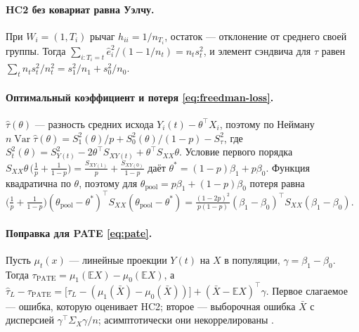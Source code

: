 \documentclass[10pt,a4paper]{article}
\newcommand{\E}{\mathbb{E}}
\newcommand{\Var}{\operatorname{Var}}
\newcommand{\T}{^{\top}}
\begin{document}
\paragraph{HC2 без ковариат равна Уэлчу.} При $W_i=(1,T_i)$ рычаг $h_{ii}=1/n_{T_i}$, остаток --- отклонение от среднего
своей группы. Тогда $\sum_{i:T_i=t}\hat e_i^2/(1-1/n_t)=n_ts_t^2$, и элемент сэндвича для $\tau$ равен
$\sum_t n_ts_t^2/n_t^2=s_1^2/n_1+s_0^2/n_0$.

\paragraph{Оптимальный коэффициент и потеря \eqref{eq:freedman-loss}.} $\hat\tau(\theta)$ --- разность средних исхода
$Y_i(t)-\theta\T X_i$, поэтому по Нейману \citep{neyman1923, imbensrubin2015}
$n\Var\hat\tau(\theta)=S^2_1(\theta)/p+S^2_0(\theta)/(1-p)-S^2_\tau$, где
$S^2_t(\theta)=S^2_{Y(t)}-2\theta\T S_{XY(t)}+\theta\T S_{XX}\theta$. Условие первого порядка
$S_{XX}\theta\,\bigl(\tfrac1p+\tfrac1{1-p}\bigr)=\tfrac{S_{XY(1)}}{p}+\tfrac{S_{XY(0)}}{1-p}$ даёт
$\theta^*=(1-p)\beta_1+p\beta_0$. Функция квадратична по $\theta$, поэтому для $\theta_{\text{pool}}=p\beta_1+(1-p)\beta_0$
потеря равна $\bigl(\tfrac1p+\tfrac1{1-p}\bigr)(\theta_{\text{pool}}-\theta^*)\T S_{XX}(\theta_{\text{pool}}-\theta^*)
=\tfrac{(1-2p)^2}{p(1-p)}(\beta_1-\beta_0)\T S_{XX}(\beta_1-\beta_0)$.

\paragraph{Поправка для PATE \eqref{eq:pate}.} Пусть $\mu_t(x)$ --- линейные проекции $Y(t)$ на $X$ в популяции,
$\gamma=\beta_1-\beta_0$. Тогда $\tau_{\text{PATE}}=\mu_1(\E X)-\mu_0(\E X)$, а
$\hat\tau_L-\tau_{\text{PATE}}=\bigl[\hat\tau_L-(\mu_1(\bar X)-\mu_0(\bar X))\bigr]+(\bar X-\E X)\T\gamma$.
Первое слагаемое --- ошибка, которую оценивает HC2; второе --- выборочная ошибка $\bar X$ с дисперсией
$\gamma\T\Sigma_X\gamma/n$; асимптотически они некоррелированы \citep{negiwooldridge2021}.
\end{document}
